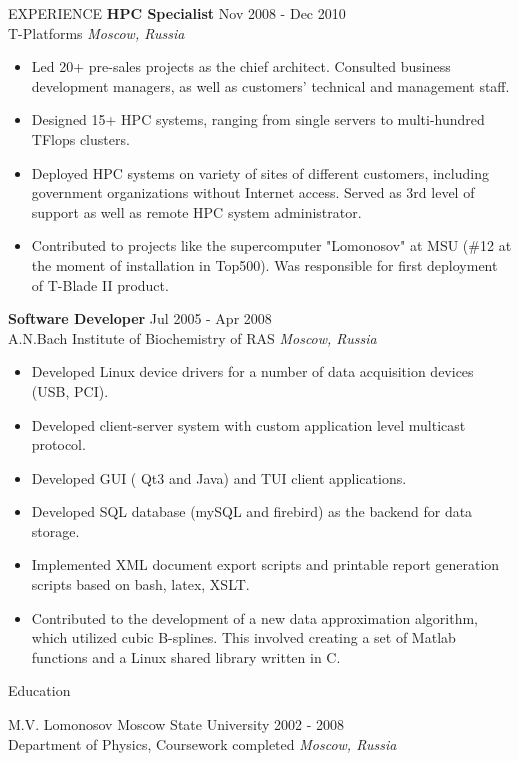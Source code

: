 \documentclass{resume} %
\begin{document}
\begin{rSection}{EXPERIENCE}
\textbf{HPC Specialist} \hfill Nov 2008 - Dec 2010\\
T-Platforms \hfill \textit{Moscow, Russia}
 \begin{itemize}
    \itemsep -3pt {}
    \item Led 20+ pre-sales projects as the chief architect. Consulted business development managers, as well as customers' technical and management staff.
    \item Designed 15+ HPC systems, ranging from single servers to multi-hundred TFlops clusters.
    \item Deployed HPC systems on variety of sites of different customers, including government organizations without Internet access. Served as 3rd level of support as well as remote HPC system administrator.
    \item Contributed to projects like the supercomputer "Lomonosov" at MSU (\#12 at the moment of installation in Top500). Was responsible for first deployment of T-Blade II product.
 \end{itemize}

\textbf{Software Developer} \hfill Jul 2005 - Apr 2008\\
A.N.Bach Institute of Biochemistry of RAS \hfill \textit{Moscow, Russia}
 \begin{itemize}
    \itemsep -3pt {}
    \item Developed Linux device drivers for a number of data acquisition devices (USB, PCI).
    \item Developed client-server system with custom application level multicast protocol.
    \item Developed GUI ( Qt3 and Java) and TUI client applications.
    \item Developed SQL database (mySQL and firebird) as the backend for data storage.
    \item Implemented XML document export scripts and printable report generation scripts based on bash, latex, XSLT.
    \item Contributed to the development of a new data approximation algorithm, which utilized cubic B-splines. This involved creating a set of Matlab functions and a Linux shared library written in C.
 \end{itemize}

\end{rSection}


\begin{rSection}{Education}

M.V. Lomonosov Moscow State University \hfill {2002 - 2008}\\
Department of Physics, Coursework completed \hfill \textit{Moscow, Russia}

\end{rSection}
\end{document}
